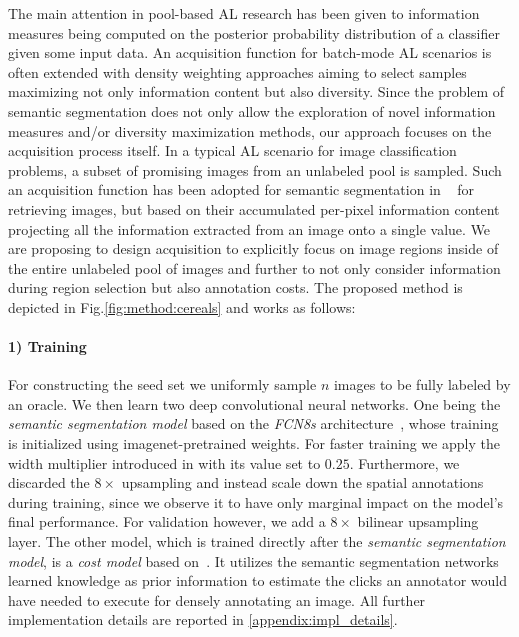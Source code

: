 \documentclass{bmvc2k}
\begin{document}
The main attention in pool-based AL research has been given to information measures being computed on the posterior probability distribution of a classifier given some input data. An acquisition function for batch-mode AL scenarios is often extended with density weighting approaches aiming to select samples maximizing not only information content but also diversity. Since the problem of semantic segmentation does not only allow the exploration of novel information measures and/or diversity maximization methods, our approach focuses on the acquisition process itself. In a typical AL scenario for image classification problems, a subset of promising images from an unlabeled pool is sampled. Such an acquisition function has been adopted for semantic segmentation in ~\cite{DBLP:journals/corr/abs-1711-09168} for retrieving images, but based on their accumulated per-pixel information content projecting all the information extracted from an image onto a single value. We are proposing to design acquisition to explicitly focus on image regions inside of the entire unlabeled pool of images and further to not only consider information during region selection but also annotation costs. The proposed method is depicted in Fig.\ref{fig:method:cereals} and works as follows:

\vspace{-0.25cm}\paragraph{1) Training}\label{method:training}
For constructing the seed set we uniformly sample $n$ images to be fully labeled by an oracle. We then learn two deep convolutional neural networks. One being the \textit{semantic segmentation model} based on the \textit{FCN8s} architecture~\cite{DBLP:conf/cvpr/LongSD15}, whose training is initialized using imagenet-pretrained weights. For faster training we apply the width multiplier introduced in \cite{DBLP:journals/corr/HowardZCKWWAA17} with its value set to $0.25$. Furthermore, we discarded the $8\times$ upsampling and instead scale down the spatial annotations during training, since we observe it to have only marginal impact on the model's final performance. For validation however, we add a $8\times$ bilinear upsampling layer. The other model, which is trained directly after the \textit{semantic segmentation model}, is a \textit{cost model} based on~\cite{DBLP:conf/cvpr/KirillovLASR17}. It utilizes the semantic segmentation networks learned knowledge as prior information to estimate the clicks an annotator would have needed to execute for densely annotating an image. All further implementation details are reported in \ref{appendix:impl_details}. 
\end{document}
